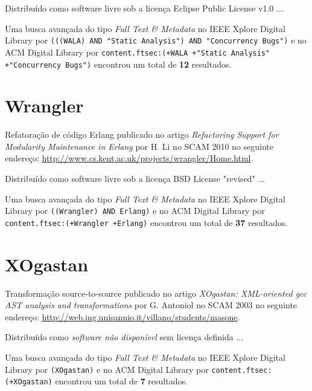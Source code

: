 Distribuído como software livre
sob a licença Eclipse Public License v1.0 ...


Uma busca avançada do tipo {\it Full Text \& Metadata} no IEEE Xplore Digital Library por
\texttt{(((WALA) AND "Static Analysis") AND "Concurrency Bugs")}
e no ACM Digital Library por
\texttt{content.ftsec:(+WALA +"Static Analysis" +"Concurrency Bugs")}
encontrou um total de
{\bf 12}
resultados.

\section{Wrangler}

Refatoração de código Erlang
publicado no artigo
{\it Refactoring Support for Modularity Maintenance in Erlang}
por
H. Li
no
SCAM
2010
no seguinte endereço:
\url{http://www.cs.kent.ac.uk/projects/wrangler/Home.html}.

Distribuído como software livre
sob a licença BSD License "revised" ...


Uma busca avançada do tipo {\it Full Text \& Metadata} no IEEE Xplore Digital Library por
\texttt{((Wrangler) AND Erlang)}
e no ACM Digital Library por
\texttt{content.ftsec:(+Wrangler +Erlang)}
encontrou um total de
{\bf 37}
resultados.

\section{XOgastan}

Transformação source-to-source
publicado no artigo
{\it XOgastan: XML-oriented gcc AST analysis and transformations}
por
G. Antoniol
no
SCAM
2003
no seguinte endereço:
\url{http://web.ing.unisannio.it/villano/students/masone}.

Distribuído como {\it software não disponível}
sem licença definida ...


Uma busca avançada do tipo {\it Full Text \& Metadata} no IEEE Xplore Digital Library por
\texttt{(XOgastan)}
e no ACM Digital Library por
\texttt{content.ftsec:(+XOgastan)}
encontrou um total de
{\bf 7}
resultados.


